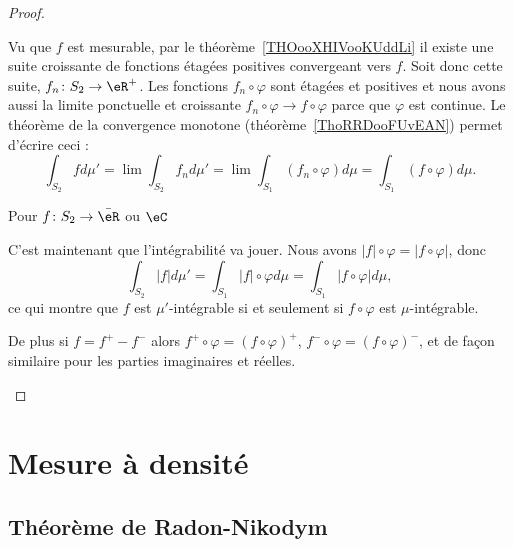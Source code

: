 \begin{proof}
\begin{subproof}
            Vu que \( f\) est mesurable, par le théorème~\ref{THOooXHIVooKUddLi} il existe une suite croissante de fonctions étagées positives convergeant vers \( f\). Soit donc cette suite, \( f_n\colon S_2\to \eR^+\). Les fonctions \( f_n\circ\varphi\) sont étagées et positives et nous avons aussi la limite ponctuelle et croissante \( f_n\circ\varphi\to f\circ\varphi\) parce que \( \varphi\) est continue. Le théorème de la convergence monotone (théorème~\ref{ThoRRDooFUvEAN}) permet d'écrire ceci :
            \begin{equation}
                \int_{S_2}fd\mu'=\lim\int_{S_2}f_nd\mu'= \lim\int_{S_1}(f_n\circ\varphi)d\mu=\int_{S_1}(f\circ\varphi)d\mu.
            \end{equation}
        \item[Pour \( f\colon S_2\to \bar \eR\) ou \( \eC\) ]

            C'est maintenant que l'intégrabilité va jouer. Nous avons \( | f |\circ\varphi=| f\circ\varphi |\), donc
            \begin{equation}
                \int_{S_2}| f |d\mu'=\int_{S_1}| f |\circ\varphi d\mu=\int_{S_1}| f\circ \varphi |d\mu,
            \end{equation}
            ce qui montre que \( f\) est \( \mu'\)-intégrable si et seulement si \( f\circ\varphi\) est \( \mu\)-intégrable.

            De plus si \(f=f^+-f^- \) alors \( f^+\circ\varphi=(f\circ\varphi)^+\), \( f^-\circ\varphi=(f\circ\varphi)^-\), et de façon similaire pour les parties imaginaires et réelles.
    \end{subproof}
\end{proof}

\section{Mesure à densité}

\subsection{Théorème de Radon-Nikodym}

